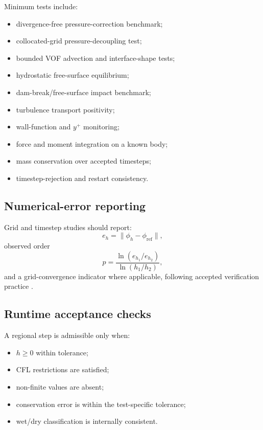 \documentclass[11pt,a4paper]{article}
\begin{document}
Minimum tests include:
\begin{itemize}
  \item divergence-free pressure-correction benchmark;
  \item collocated-grid pressure-decoupling test;
  \item bounded VOF advection and interface-shape tests;
  \item hydrostatic free-surface equilibrium;
  \item dam-break/free-surface impact benchmark;
  \item turbulence transport positivity;
  \item wall-function and $y^+$ monitoring;
  \item force and moment integration on a known body;
  \item mass conservation over accepted timesteps;
  \item timestep-rejection and restart consistency.
\end{itemize}

\subsection{Numerical-error reporting}

Grid and timestep studies should report:
\begin{equation}
  e_h=\|\phi_h-\phi_{\mathrm{ref}}\|,
\end{equation}
observed order
\begin{equation}
  p=\frac{\ln(e_{h_1}/e_{h_2})}{\ln(h_1/h_2)},
\end{equation}
and a grid-convergence indicator where applicable, following accepted verification practice \cite{roache1994}.

\subsection{Runtime acceptance checks}

A regional step is admissible only when:
\begin{itemize}
  \item $h\ge0$ within tolerance;
  \item CFL restrictions are satisfied;
  \item non-finite values are absent;
  \item conservation error is within the test-specific tolerance;
  \item wet/dry classification is internally consistent.
\end{itemize}
\end{document}
